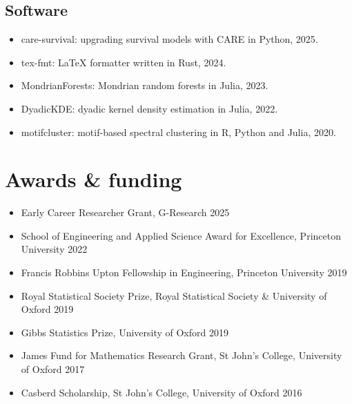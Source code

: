 \documentclass{wgu-cv}
\begin{document}
\subsection{Software}{}
\begin{itemize}

  \item care-survival: upgrading survival models with CARE in Python, 2025. \\

  \item tex-fmt: LaTeX formatter written in Rust, 2024.

  \item MondrianForests: Mondrian random forests in Julia, 2023. \\

  \item DyadicKDE: dyadic kernel density estimation in Julia, 2022. \\

  \item motifcluster: motif-based spectral clustering
    in R, Python and Julia, 2020. \\

\end{itemize}

\pagebreak

\section{Awards \& funding}
\vspace{-0.22cm}

\begin{itemize}
  \item Early Career Researcher Grant,
    G-Research
    \hfill 2025%
  \item School of Engineering and Applied Science Award for Excellence,
    Princeton University
    \hfill 2022%
  \item Francis Robbins Upton Fellowship in Engineering,
    Princeton University
    \hfill 2019%
  \item Royal Statistical Society Prize,
    Royal Statistical Society \& University of Oxford
    \hfill 2019%
  \item Gibbs Statistics Prize,
    University of Oxford
    \hfill 2019%
  \item James Fund for Mathematics Research Grant,
    St John's College, University of Oxford
    \hfill 2017%
  \item Casberd Scholarship,
    St John's College, University of Oxford
    \hfill 2016%
\end{itemize}
\end{document}
